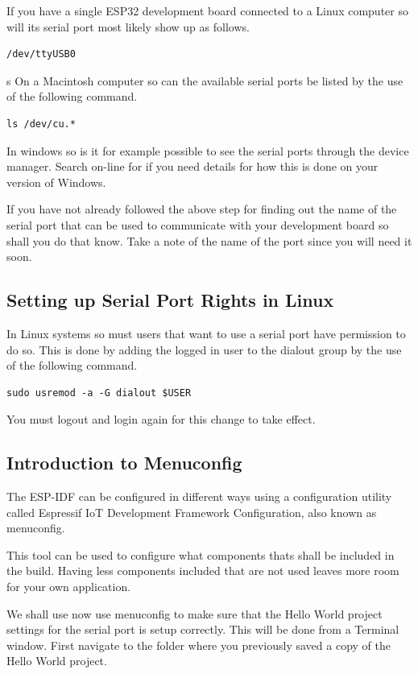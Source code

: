 \documentclass{tufte-book}
\begin{document}
If you have a single ESP32 development board connected to a Linux computer so will its serial port most likely show up as follows.

\begin{lstlisting}
/dev/ttyUSB0
\end{lstlisting}
s
On a Macintosh computer so can the available serial ports be listed by the use of the following command.

\begin{lstlisting}
ls /dev/cu.*
\end{lstlisting}

In windows so is it for example possible to see the serial ports through the device manager. Search on-line for  if you need details for how this is done on your version of Windows.

If you have not already followed the above step for finding out the name of the serial port that can be used to communicate with your development board so shall you do that know. Take a note of the name of the port since you will need it soon.

\subsection{Setting up Serial Port Rights in Linux}
In Linux systems so must users that want to use a serial port have permission to do so. This is done by adding the logged in user to the dialout group by the use of the following command.

\begin{lstlisting}
sudo usremod -a -G dialout $USER
\end{lstlisting}

You must logout and login again for this change to take effect.

\subsection{Introduction to Menuconfig}
The ESP-IDF can be configured in different ways using a configuration utility called Espressif IoT Development Framework Configuration, also known as menuconfig.

This tool can be used to configure what components thats shall be included in the build. Having less components included that are not used leaves more room for your own application.

We shall use now use menuconfig to make sure that the Hello World project settings for the serial port is setup correctly. This will be done from a Terminal window. First navigate to the folder where you previously saved a copy of the Hello World project.
\end{document}
